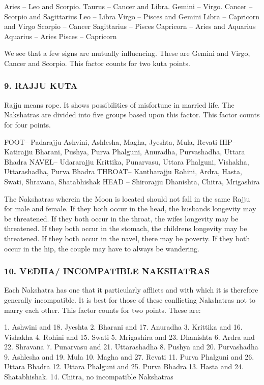  

Aries – Leo and Scorpio.
Taurus – Cancer and Libra.
Gemini – Virgo.
Cancer – Scorpio and Sagittarius
Leo – Libra
Virgo – Pisces and Gemini
Libra – Capricorn and Virgo
Scorpio – Cancer
Sagittarius – Pisces
Capricorn – Aries and Aquarius
Aquarius – Aries
Pisces – Capricorn
 

We see that a few signs are mutually influencing. These are Gemini and Virgo, Cancer and Scorpio. This factor counts for two kuta points.

 

\subsubsection{9. RAJJU KUTA}
 

Rajju means rope. It shows possibilities of misfortune in married life. The Nakshatras are divided into five groups based upon this factor. This factor counts for four points.

 

FOOT– Padarajju
Ashvini, Ashlesha, Magha, Jyeshta, Mula, Revati
HIP– Katirajju
Bharani, Pushya, Purva Phalguni, Anuradha, Purvashadha, Uttara Bhadra
NAVEL– Udararajju
Krittika, Punarvasu, Uttara Phalguni, Vishakha, Uttarashadha, Purva Bhadra
THROAT– Kantharajju
Rohini, Ardra, Hasta, Swati, Shravana, Shatabhishak
HEAD – Shirorajju
Dhanishta, Chitra, Mrigashira
 

The Nakshatras wherein the Moon is located should not fall in the same Rajju for male and female. If they both occur in the head, the husbands longevity may be threatened. If they both occur in the throat, the wifes longevity may be threatened. If they both occur in the stomach, the childrens longevity may be threatened. If they both occur in the navel, there may be poverty. If they both occur in the hip, the couple may have to always be wandering.

 

\subsubsection{10. VEDHA/ INCOMPATIBLE NAKSHATRAS}
 

Each Nakshatra has one that it particularly afflicts and with which it is therefore generally incompatible. It is best for those of these conflicting Nakshatras not to marry each other. This factor counts for two points. These are:

 

1. Ashwini and 18. Jyeshta	2. Bharani and 17. Anuradha
3. Krittika and 16. Vishakha	4. Rohini and 15. Swati
5. Mrigashira and 23. Dhanishta	6. Ardra and 22. Shravana
7. Punarvasu and 21. Uttarashadha	8. Pushya and 20. Purvashadha
9. Ashlesha and 19. Mula	10. Magha and 27. Revati
11. Purva Phalguni and 26. Uttara Bhadra	12. Uttara Phalguni and 25. Purva Bhadra
13. Hasta and 24. Shatabhishak.	14. Chitra, no incompatible Nakshatras
 

